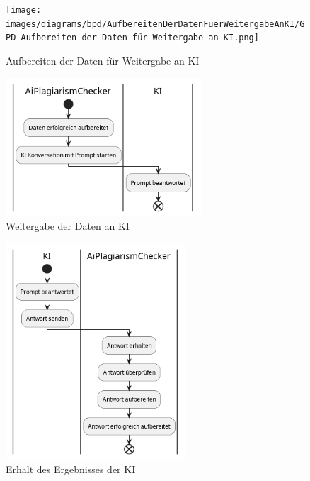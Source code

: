 \begin{figure}[H]
    \centering
    \texttt{[image: images/diagrams/bpd/AufbereitenDerDatenFuerWeitergabeAnKI/GPD-Aufbereiten der Daten für Weitergabe an KI.png]}
    \caption{Aufbereiten der Daten für Weitergabe an KI}
    \label{fig:aufbereitenDerDatenFuerWeitergabeAnKI}
\end{figure}

\begin{figure}[H]
    \centering
    \includegraphics[width=0.65\textwidth]{images/diagrams/bpd/WeitergabeDerDatenAnKI/GPD-Weitergabe der Daten an KI.png}
    \caption{Weitergabe der Daten an KI}
    \label{fig:weitergabeDerDatenAnKI}
\end{figure}

\begin{figure}[H]
    \centering
    \includegraphics[width=0.6\textwidth]{images/diagrams/bpd/ErhaltDesErgebnissesDerKI/GPD-Erhalt des Ergebnisses der KI.png}
    \caption{Erhalt des Ergebnisses der KI}
    \label{fig:erhaltDesErgebnissesDerKI}
\end{figure}

